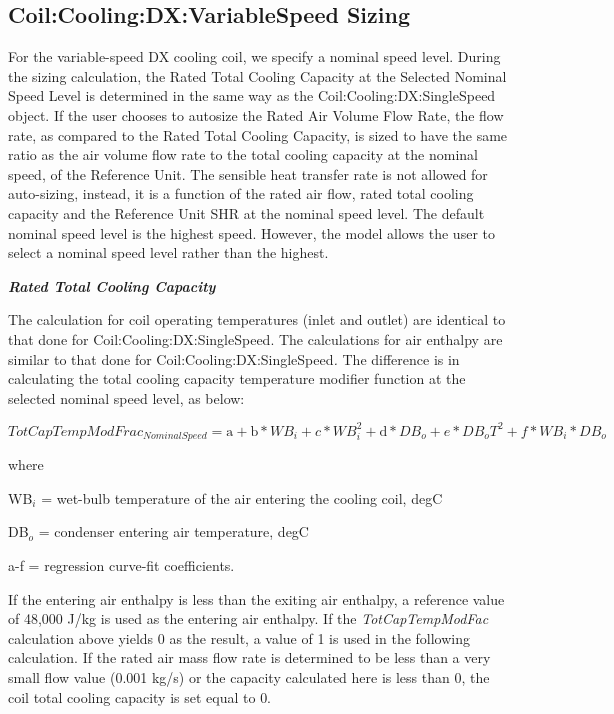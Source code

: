 \subsection{Coil:Cooling:DX:VariableSpeed Sizing}\label{coilcoolingdxvariablespeed-sizing}

For the variable-speed DX cooling coil, we specify a nominal speed level. During the sizing calculation, the Rated Total Cooling Capacity at the Selected Nominal Speed Level is determined in the same way as the Coil:Cooling:DX:SingleSpeed object. If the user chooses to autosize the Rated Air Volume Flow Rate, the flow rate, as compared to the Rated Total Cooling Capacity, is sized to have the same ratio as the air volume flow rate to the total cooling capacity at the nominal speed, of the Reference Unit. The sensible heat transfer rate is not allowed for auto-sizing, instead, it is a function of the rated air flow, rated total cooling capacity and the Reference Unit SHR at the nominal speed level. The default nominal speed level is the highest speed. However, the model allows the user to select a nominal speed level rather than the highest.

\textbf{\emph{Rated Total Cooling Capacity}}

The calculation for coil operating temperatures (inlet and outlet) are identical to that done for Coil:Cooling:DX:SingleSpeed. The calculations for air enthalpy are similar to that done for Coil:Cooling:DX:SingleSpeed\emph{.} The difference is in calculating the total cooling capacity temperature modifier function at the selected nominal speed level, as below:

\begin{equation}
TotCapTempModFra{c_{NominalSpeed}} = {\mathrm{a}} + {\mathrm{b*}}W{B_i} + c*WB_i^2 + {\mathrm{d*}}D{B_o} + e*D{B_o}{T^2} + f*W{B_i}*D{B_o}
\end{equation}

where

WB\(_{i}\) = wet-bulb temperature of the air entering the cooling coil, degC

DB\(_{o}\) = condenser entering air temperature, degC

a-f = regression curve-fit coefficients.

If the entering air enthalpy is less than the exiting air enthalpy, a reference value of 48,000 J/kg is used as the entering air enthalpy. If the \emph{TotCapTempModFac} calculation above yields 0 as the result, a value of 1 is used in the following calculation. If the rated air mass flow rate is determined to be less than a very small flow value (0.001 kg/s) or the capacity calculated here is less than 0, the coil total cooling capacity is set equal to 0.

